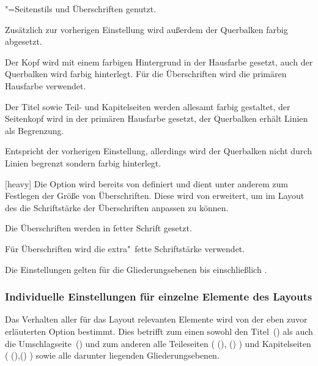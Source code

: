 \begin{Declaration*}{}
\begin{Declaration*}{}
\begin{Declaration*}{}
\begin{Declaration}
\begin{values}{}
  "=Seitenstils und Überschriften genutzt.
\item[barcolor]
  Zusätzlich zur vorherigen Einstellung wird außerdem der Querbalken farbig 
  abgesetzt.
\item[bicolor/bichrome]
  Der Kopf wird mit einem farbigen Hintergrund in der Hausfarbe gesetzt, auch 
  der Querbalken wird farbig hinterlegt. Für die Überschriften wird die 
  primären Hausfarbe verwendet.
\item[color]
  Der Titel sowie Teil- und Kapitelseiten werden allesamt farbig gestaltet, 
  der Seitenkopf wird in der primären Hausfarbe  gesetzt, der 
  Querbalken erhält Linien als Begrenzung.
\item[fullcolor/full]
  Entspricht der vorherigen Einstellung, allerdings wird der Querbalken nicht 
  durch Linien begrenzt sondern farbig hinterlegt.
\end{values}
\end{Declaration}
\newcommand*\cdalias{false,true,lightcolor,barcolor,bicolor,color,fullcolor}

\begin{Declaration}[v2.06]{}[heavy]
\printdeclarationlist%
%
%
Die Option  wird bereits von \KOMAScript{} definiert und 
dient unter anderem zum Festlegen der Größe von Überschriften. Diese wird von 
\TUDScript erweitert, um im Layout des \CDs die Schriftstärke der Überschriften 
anpassen zu können.
%
\begin{values}{}
\item[light/normalbold]
  Die Überschriften werden in fetter Schrift gesetzt.
\item[heavy/ultrabold]
  Für Überschriften wird die extra"~fette Schriftstärke verwendet.
\end{values}
%
Die Einstellungen gelten für die Gliederungsebenen bis einschließlich 
.
\end{Declaration}


\subsubsection{Individuelle Einstellungen für einzelne Elemente des Layouts}
Das Verhalten aller für das Layout relevanten Elemente wird von der eben zuvor 
erläuterten Option  bestimmt. Dies betrifft zum einen sowohl 
den Titel~() als auch die Umschlagseite~() 
und zum anderen alle Teileseiten (%
  (), ()%
) und Kapitelseiten (%
  (),()%
) sowie alle darunter liegenden Gliederungsebenen.


\end{Declaration*}
\end{Declaration*}
\end{Declaration*}
